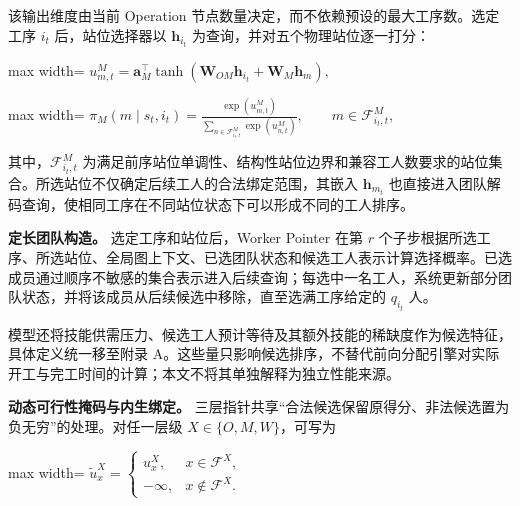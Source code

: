 \documentclass[journal,10pt]{IEEEtran}
\begin{document}
该输出维度由当前 Operation 节点数量决定，而不依赖预设的最大工序数。选定工序 \(i_t\) 后，站位选择器以 \(\mathbf h_{i_t}\) 为查询，并对五个物理站位逐一打分：

\begin{center}
\begin{adjustbox}{max width=\columnwidth}
$\displaystyle
u_{m,t}^{M}=\mathbf a_M^{\top}
\tanh\!\left(
\mathbf W_{OM}\mathbf h_{i_t}+\mathbf W_M\mathbf h_m
\right),
$
\end{adjustbox}
\end{center}

\begin{center}
\begin{adjustbox}{max width=\columnwidth}
$\displaystyle
\pi_M(m\mid s_t,i_t)=
\frac{\exp(u_{m,t}^{M})}
{\displaystyle\sum_{n\in\mathcal F_{i_t,t}^{M}}\exp(u_{n,t}^{M})},
\qquad m\in\mathcal F_{i_t,t}^{M},
$
\end{adjustbox}
\end{center}

其中，\(\mathcal F_{i_t,t}^{M}\) 为满足前序站位单调性、结构性站位边界和兼容工人数要求的站位集合。所选站位不仅确定后续工人的合法绑定范围，其嵌入 \(\mathbf h_{m_t}\) 也直接进入团队解码查询，使相同工序在不同站位状态下可以形成不同的工人排序。

\textbf{定长团队构造。} 选定工序和站位后，Worker Pointer 在第 \(r\) 个子步根据所选工序、所选站位、全局图上下文、已选团队状态和候选工人表示计算选择概率。已选成员通过顺序不敏感的集合表示进入后续查询；每选中一名工人，系统更新部分团队状态，并将该成员从后续候选中移除，直至选满工序给定的 \(q_{i_t}\) 人。

模型还将技能供需压力、候选工人预计等待及其额外技能的稀缺度作为候选特征，具体定义统一移至附录 A。这些量只影响候选排序，不替代前向分配引擎对实际开工与完工时间的计算；本文不将其单独解释为独立性能来源。

\textbf{动态可行性掩码与内生绑定。} 三层指针共享``合法候选保留原得分、非法候选置为负无穷''的处理。对任一层级 \(X\in\lbrace{}O,M,W\rbrace{}\)，可写为

\begin{center}
\begin{adjustbox}{max width=\columnwidth}
$\displaystyle
\widetilde u_x^{X}=
\begin{cases}
u_x^{X}, & x\in\mathcal F^{X},\\
-\infty, & x\notin\mathcal F^{X}.
\end{cases}
$
\end{adjustbox}
\end{center}
\end{document}
